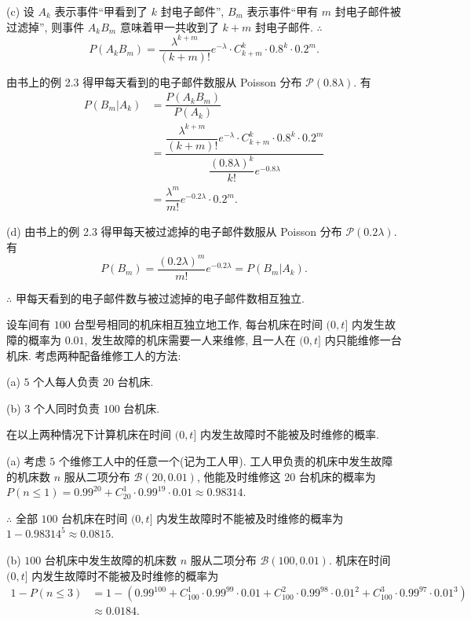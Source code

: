 \documentclass{ctexart}
\begin{document}
\begin{solution}
    (c) 设 $A_k$ 表示事件``甲看到了 $k$ 封电子邮件'',  $B_m$ 表示事件``甲有 $m$ 封电子邮件被过滤掉'', 则事件 $A_kB_m$ 意味着甲一共收到了 $k+m$ 封电子邮件. $\therefore$
    \[P(A_kB_m)=\dfrac{\lambda^{k+m}}{(k+m)!}e^{-\lambda}\cdot C_{k+m}^k\cdot0.8^k\cdot0.2^m.\]

    由书上的例 2.3 得甲每天看到的电子邮件数服从 Poisson 分布 $\mathcal{P}(0.8\lambda)$. 有
    \begin{align*}
        P(B_m|A_k) & =\dfrac{P(A_kB_m)}{P(A_k)} \\
        & =\dfrac{\dfrac{\lambda^{k+m}}{(k+m)!}e^{-\lambda}\cdot C_{k+m}^k\cdot0.8^k\cdot0.2^m}{\dfrac{(0.8\lambda)^k}{k!}e^{-0.8\lambda}} \\
        & =\dfrac{\lambda^m}{m!}e^{-0.2\lambda}\cdot0.2^m.
    \end{align*}

    (d) 由书上的例 2.3 得甲每天被过滤掉的电子邮件数服从 Poisson 分布 $\mathcal{P}(0.2\lambda)$. 有
    \[P(B_m)=\dfrac{(0.2\lambda)^m}{m!}e^{-0.2\lambda}=P(B_m|A_k).\]

    $\therefore$ 甲每天看到的电子邮件数与被过滤掉的电子邮件数相互独立.
\end{solution}
\begin{exercise}%
    设车间有 $100$ 台型号相同的机床相互独立地工作, 每台机床在时间 $(0,t]$ 内发生故障的概率为 $0.01$, 发生故障的机床需要一人来维修, 且一人在 $(0,t]$ 内只能维修一台机床. 考虑两种配备维修工人的方法:

    (a) $5$ 个人每人负责 $20$ 台机床.
    
    (b) $3$ 个人同时负责 $100$ 台机床.

    在以上两种情况下计算机床在时间 $(0,t]$ 内发生故障时不能被及时维修的概率.
\end{exercise}
\begin{solution}
    (a) 考虑 $5$ 个维修工人中的任意一个(记为工人甲). 工人甲负责的机床中发生故障的机床数 $n$ 服从二项分布 $\mathcal{B}(20,0.01)$, 他能及时维修这 $20$ 台机床的概率为 $P(n\leq1)=0.99^{20}+C_{20}^1\cdot0.99^{19}\cdot0.01\approx0.98314$.

    $\therefore$ 全部 $100$ 台机床在时间 $(0,t]$ 内发生故障时不能被及时维修的概率为 $1-0.98314^5\approx0.0815$.

    (b) $100$ 台机床中发生故障的机床数 $n$ 服从二项分布 $\mathcal{B}(100,0.01)$. 机床在时间 $(0,t]$ 内发生故障时不能被及时维修的概率为
    \begin{align*}
        1-P(n\leq 3) & =1-(0.99^{100}+C_{100}^1\cdot0.99^{99}\cdot0.01+C_{100}^2\cdot0.99^{98}\cdot0.01^2+C_{100}^3\cdot0.99^{97}\cdot0.01^3) \\
        & \approx0.0184.
    \end{align*}
\end{solution}
\end{document}
